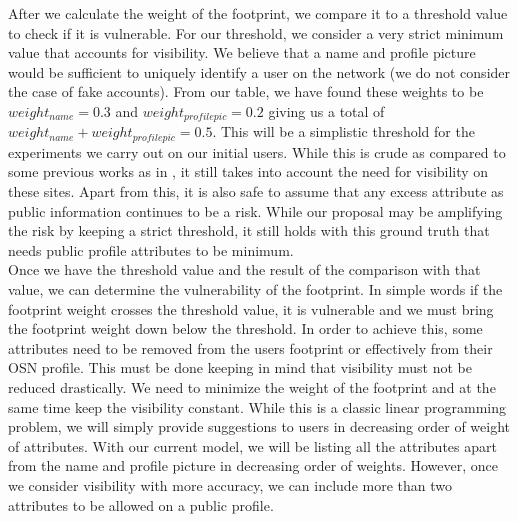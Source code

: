 \documentclass[10pt,conference]{IEEEtran}
\begin{document}
After we calculate the weight of the footprint, we compare it to a threshold value to check if it is vulnerable. For our threshold, we consider a very strict minimum value that accounts for visibility. We believe that a name and profile picture would be sufficient to uniquely identify a user on the network (we do not consider the case of fake accounts). From our table, we have found these weights to be $ weight_{name} = 0.3 $ and $ weight_{profilepic} = 0.2 $ giving us a total of $ weight_{name} +  weight_{profilepic} = 0.5 $. This will be a simplistic threshold for the experiments we carry out on our initial users. While this is crude as compared to some previous works as in \cite{pidx}, it still takes into account the need for visibility on these sites. Apart from this, it is also safe to assume that any excess attribute as public information continues to be a risk. While our proposal may be amplifying the risk by keeping a strict threshold, it still holds with this ground truth that needs public profile attributes to be minimum. \\

Once we have the threshold value and the result of the comparison with that value, we can determine the vulnerability of the footprint. In simple words if the footprint weight crosses the threshold value, it is vulnerable and we must bring the footprint weight down below the threshold. In order to achieve this, some attributes need to be removed from the users footprint or effectively from their OSN profile. This must be done keeping in mind that visibility must not be reduced drastically. We need to minimize the weight of the footprint and at the same time keep the visibility constant. While this is a classic linear programming problem, we will simply provide suggestions to users in decreasing order of weight of attributes. With our current model, we will be listing all the attributes apart from the name and profile picture in decreasing order of weights. However, once we consider visibility with more accuracy, we can include more than two attributes to be allowed on a public profile. \\
 
\end{document}
